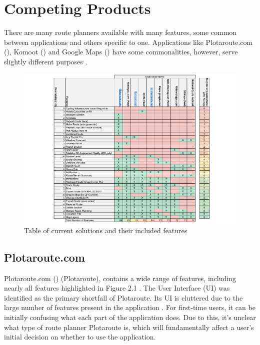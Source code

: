 \section{Competing Products}
\label{litrev:competingproducts}

There are many route planners available with many features, some common between applications and others specific to one. Applications like Plotaroute.com (\cite{noauthor_free_nodate}), Komoot (\cite{noauthor_komoot_nodate}) and Google Maps (\cite{noauthor_google_nodate}) have some commonalities, however, serve slightly different purposes .

\begin{figure}[h!]
    \centering
    \includegraphics[width=1\linewidth]{figures/current_apps.pdf}
    \caption{Table of current solutions and their included features}
    \label{fig:solutionsandfeatures}
\end{figure}

\subsection{Plotaroute.com}
\label{litrev:plotaroute}
Plotaroute.com (\cite{noauthor_free_nodate}) (Plotaroute), contains a wide range of features, including nearly all features highlighted in Figure 2.1 . The User Interface (UI) was identified as the primary shortfall of Plotaroute. Its UI is cluttered due to the large number of features present in the application . For first-time users, it can be initially confusing what each part of the application does. Due to this, it's unclear what type of route planner Plotaroute is, which will fundamentally affect a user's initial decision on whether to use the application.

